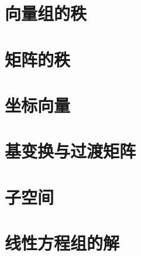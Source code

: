 
\section{向量组的秩}







\section{矩阵的秩}







\section{坐标向量}







\section{基变换与过渡矩阵}







\section{子空间}







\section{线性方程组的解}






